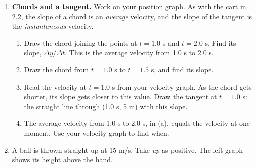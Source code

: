 \documentclass[12pt, twoside]{article}
\begin{document}
\begin{enumerate}[itemsep=0.4cm]
\item \textbf{Chords and a tangent.} Work on your position graph. As with the cart in
  2.2, the slope of a chord is an \emph{average} velocity, and the slope of the
  tangent is the \emph{instantaneous} velocity.
  \begin{enumerate}[itemsep=0.6cm]
    \item Draw the chord joining the points at $t = 1.0$ s and $t = 2.0$ s. Find its
      slope, $\Delta y / \Delta t$. This is the average velocity from 1.0 s to 2.0 s.
    \item Draw the chord from $t = 1.0$ s to $t = 1.5$ s, and find its slope.
    \item Read the velocity at $t = 1.0$ s from your velocity graph. As the chord
      gets shorter, its slope gets closer to this value. Draw the tangent at
      $t = 1.0$ s: the straight line through (1.0 s, 5 m) with this slope.
    \item The average velocity from 1.0 s to 2.0 s, in (a), equals the velocity at
      one moment. Use your velocity graph to find when.
  \end{enumerate}

  \vspace{0.6cm}

\item A ball is thrown straight up at 15 m/s. Take \emph{up} as positive. The left
  graph shows its height above the hand.

  \vspace{0.1cm}
  \hfill


\end{enumerate}
\end{document}
